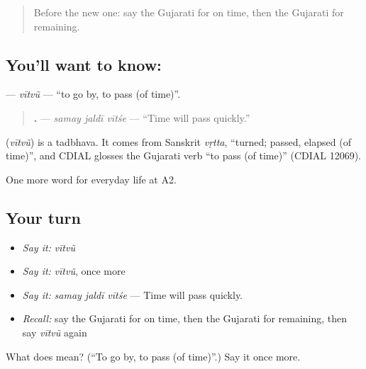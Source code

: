 \label{lesson:GU-C178-vitvu}



\begin{quote}
Before the new one: say the Gujarati for on time, then the Gujarati for remaining.
\end{quote}

\subsection*{You'll want to know: }
\textbf{} — \emph{vītvũ} — \textquotedblleft{}to go by, to pass (of time)\textquotedblright{}.

\begin{quote}
\textbf{  .} — \emph{samay jaldī vītśe} — \textquotedblleft{}Time will pass quickly.\textquotedblright{}
\end{quote}

\begin{cousinweb}
\textbf{} (\emph{vītvũ}) is a tadbhava. It comes from Sanskrit \emph{vṛtta}, \textquotedblleft{}turned; passed, elapsed (of time)\textquotedblright{}, and CDIAL glosses the Gujarati verb \textquotedblleft{}to pass (of time)\textquotedblright{} (CDIAL 12069).
\end{cousinweb}

\begin{grammarlens}[title={What you've built}]
One more word for everyday life at A2.
\end{grammarlens}

\subsection*{Your turn}
\begin{itemize}
\raggedright
  \item \emph{Say it:} \emph{vītvũ}
  \item \emph{Say it:} \emph{vītvũ}, once more
  \item \emph{Say it:} \emph{samay jaldī vītśe} — Time will pass quickly.
  \item \emph{Recall:} say the Gujarati for on time, then the Gujarati for remaining, then say \emph{vītvũ} again
\end{itemize}

\begin{tcolorbox}[breakable,colback=teal!4,colframe=teal!35!black,title={Before you move on}]
What does  mean? (\textquotedblleft{}To go by, to pass (of time)\textquotedblright{}.) Say it once more.
\end{tcolorbox}
